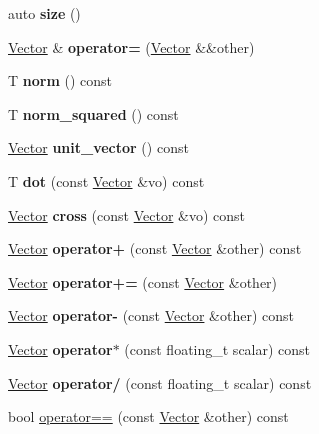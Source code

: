 \begin{DoxyCompactItemize}
auto {\bfseries size} ()
\item 
\mbox{\label{structmgs_1_1Vector_a04d59057d40555c84814d60d3d070a95}} 
\hyperlink{structmgs_1_1Vector}{Vector} \& {\bfseries operator=} (\hyperlink{structmgs_1_1Vector}{Vector} \&\&other)
\item 
\mbox{\label{structmgs_1_1Vector_a0f4f7ad795ba27430b656e792aee1910}} 
T {\bfseries norm} () const
\item 
\mbox{\label{structmgs_1_1Vector_a771d0dadb3f99ace106f67f98e61112b}} 
T {\bfseries norm\+\_\+squared} () const
\item 
\mbox{\label{structmgs_1_1Vector_a41168c8f02222da2fcefec669af1c2ef}} 
\hyperlink{structmgs_1_1Vector}{Vector} {\bfseries unit\+\_\+vector} () const
\item 
\mbox{\label{structmgs_1_1Vector_a48e39771088c8a8a4ccd136d244b7cb2}} 
T {\bfseries dot} (const \hyperlink{structmgs_1_1Vector}{Vector} \&vo) const
\item 
\mbox{\label{structmgs_1_1Vector_a0a21795061b9916f01a839df2c77ff5e}} 
\hyperlink{structmgs_1_1Vector}{Vector} {\bfseries cross} (const \hyperlink{structmgs_1_1Vector}{Vector} \&vo) const
\item 
\mbox{\label{structmgs_1_1Vector_a6ffa6e666350344296c61a880ac4cff0}} 
\hyperlink{structmgs_1_1Vector}{Vector} {\bfseries operator+} (const \hyperlink{structmgs_1_1Vector}{Vector} \&other) const
\item 
\mbox{\label{structmgs_1_1Vector_a04ece2322d6b5fabb2782fcfcc837e58}} 
\hyperlink{structmgs_1_1Vector}{Vector} {\bfseries operator+=} (const \hyperlink{structmgs_1_1Vector}{Vector} \&other)
\item 
\mbox{\label{structmgs_1_1Vector_a3a5989608b74bb77ceb95b7076d60e17}} 
\hyperlink{structmgs_1_1Vector}{Vector} {\bfseries operator-\/} (const \hyperlink{structmgs_1_1Vector}{Vector} \&other) const
\item 
\mbox{\label{structmgs_1_1Vector_a7044beae2075e2ea336785a63221d6f6}} 
\hyperlink{structmgs_1_1Vector}{Vector} {\bfseries operator$\ast$} (const floating\+\_\+t scalar) const
\item 
\mbox{\label{structmgs_1_1Vector_aa3b290272bce740e9b5b0e16660dced0}} 
\hyperlink{structmgs_1_1Vector}{Vector} {\bfseries operator/} (const floating\+\_\+t scalar) const
\item 
bool \hyperlink{structmgs_1_1Vector_aabe20a2406bb1f408f47b5d3efc2a9ae}{operator==} (const \hyperlink{structmgs_1_1Vector}{Vector} \&other) const
\end{DoxyCompactItemize}
